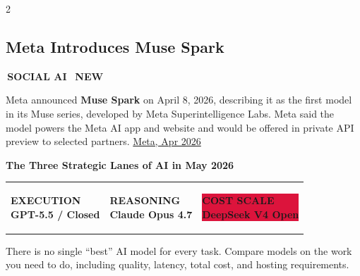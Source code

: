 \documentclass[10pt, a4paper]{article}
\newcommand{\sectiontag}[1]{%
  \noindent\colorbox{cobalt}{%
    \,\footnotesize\bfseries\color{white}\MakeUppercase{#1}\,}\,%
}
\newcommand{\newtag}{%
  \colorbox{emerald}{\,\scriptsize\bfseries\color{white}NEW\,}\ %
}
\newcommand{\ruled}{%
  \par\vspace{0.3em}%
  \noindent{\color{electric}\rule{\linewidth}{0.4pt}}\par
  \vspace{0.3em}}
\begin{document}
\begin{multicols}{2}
\ruled

\subsection{Meta Introduces Muse Spark}

\sectiontag{Social AI}\quad\newtag

\medskip
{\small
Meta announced \textbf{Muse Spark} on April 8, 2026, describing it as the first model in its Muse series, developed by Meta Superintelligence Labs. Meta said the model powers the Meta AI app and website and would be offered in private API preview to selected partners.
\href{https://about.fb.com/news/2026/04/introducing-muse-spark-meta-superintelligence-labs/}{Meta, Apr 2026}
}

\ruled

\begin{center}
  {\color{navydeep}\fontsize{11}{13}\selectfont\bfseries
    The Three Strategic Lanes of AI in May 2026}
\end{center}

\begin{center}
\begin{tabular}{>{\centering}p{2.8cm}
                >{\centering}p{2.8cm}
                p{2.8cm}}
  \colorbox{cobalt}{\parbox{2.6cm}{%
    \centering\vspace{4pt}
    \small\bfseries\color{white}EXECUTION\\
    \vspace{2pt}\scriptsize\color{white!80}GPT-5.5 / Closed
    \vspace{4pt}}} &
  \colorbox{emerald}{\parbox{2.6cm}{%
    \centering\vspace{4pt}
    \small\bfseries\color{white}REASONING\\
    \vspace{2pt}\scriptsize\color{white!80}Claude Opus 4.7
    \vspace{4pt}}} &
\colorbox{crimson}{\parbox{2.6cm}{%
    \centering\vspace{4pt}
    \small\bfseries\color{white}COST SCALE\\
    \vspace{2pt}\scriptsize\color{white!80}DeepSeek V4 Open
    \vspace{4pt}}} \\[0pt]
\end{tabular}
\end{center}

\vspace{0.4em}

\begin{insightbox}[title={\faLightbulb\quad What This Means}]
  {\small
  There is no single ``best'' AI model for every task. Compare models on the work you need to do, including quality, latency, total cost, and hosting requirements.
  }
\end{insightbox}

\end{multicols}
\clearpage
\end{document}

